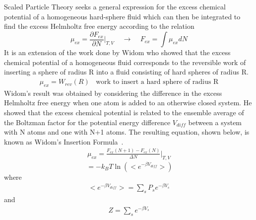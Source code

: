 \documentclass[double,12pt]{beavtex}
\begin{document}
Scaled Particle Theory
seeks a general expression for the excess chemical 
potential of a homogeneous hard-sphere fluid which can then be integrated 
to find the excess Helmholtz free energy according to the relation
\begin{equation}\mu_{ex}=\frac{\partial{F_{ex}}}{\partial{N}}\bigg|_{T,V}{~~~~~}\rightarrow{~~~~~}F_{ex}=\int{\mu_{ex}dN}\end{equation}
It is an extension of the work done by Widom who showed that the excess 
chemical potential of a homogeneous fluid corresponds to the reversible 
work of inserting a sphere of radius R into a fluid consisting of hard 
spheres of radius R. 
\begin{align}
	\mu_{ex}=W_{rev}(R){~~~~}\text{work to insert a hard sphere of radius R}
\end{align}
Widom's result was obtained by considering the difference 
in the excess Helmholtz free energy when one atom is added to an otherwise 
closed system. He showed that the excess chemical potential is related to 
the ensemble average of the Boltzman factor for the potential energy 
difference $V_{diff}$ between a system with N atoms and one with N+1 atoms. 
The resulting equation, shown below, is known as Widom's Insertion 
Formula~\cite{Hansen}.
\begin{align} \label{mu-der-int}
    \mu_{ex}=\frac{F_{ex}(N+1)-F_{ex}(N)}{\Delta{N}}\bigg|_{T,V}
\end{align}
\begin{equation}\label{widoms-insertion-formula}{~}=-k_BT\ln\left(<e^{-\beta{V_{diff}}}>\right)\end{equation}
where 
\begin{align}
    <e^{-\beta{V_{diff}}}>=\sum_s{P_se^{-\beta V_s}}
\end{align}
and
\begin{align}
    Z=\sum_s{e^{-\beta V_s}}
\end{align}
\end{document}
